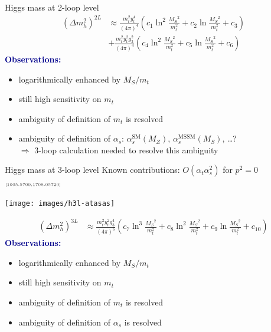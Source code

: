 \documentclass[hyperref={pdfpagelabels=false},ngerman]{beamer}
\newcommand{\cmark}{\ding{51}}%
\newcommand{\ok}{\textcolor{darkgreen}{\cmark}}
\newcommand{\MS}{\ensuremath{M_S}}
\newcommand{\mycite}[1]{\ensuremath{\text{\textcolor{darkgray}{\tiny [#1]}}}}
\renewcommand{\emph}[1]{\textbf{\textcolor{darkblue}{#1}}}
\newcommand{\SM}{\ensuremath{\text{SM}}}
\newcommand{\MSSM}{\ensuremath{\text{MSSM}}}
\newcommand{\at}{\alpha_t}
\newcommand{\as}{\alpha_s}
\begin{document}
\begin{frame}{Higgs mass at 2-loop level}
  \begin{align*}
    (\Delta m_h^2)^{2L} &\approx
    \frac{m_t^2 y_t^4}{(4\pi)^4} \left(
      c_1 \ln^2\frac{\MS^2}{m_t^2}
      + c_2 \ln\frac{\MS^2}{m_t^2}
      + c_3
    \right) \\
    & +
    \frac{m_t^2 y_t^2 g_3^2}{(4\pi)^4} \left(
      c_4 \ln^2\frac{\MS^2}{m_t^2}
      + c_5 \ln\frac{\MS^2}{m_t^2}
      + c_6
    \right)
  \end{align*}
  \emph{Observations:}
  \begin{itemize}
  \item logarithmically enhanced by $\MS / m_t$
  \item still high sensitivity on $m_t$
  \item ambiguity of definition of $m_t$ is resolved \ok
  \item ambiguity of definition of $\as$: $\as^\SM(M_Z)$, $\as^\MSSM(\MS)$, \ldots ? \\
    $\Rightarrow$ 3-loop calculation needed to resolve this ambiguity
  \end{itemize}
\end{frame}

\begin{frame}{Higgs mass at 3-loop level}
  Known contributions: $O(\at\as^2)$ for $p^2 = 0$ \mycite{1005.5709,1708.05720}
  \begin{center}
    \texttt{[image: images/h3l-atasas]}
  \end{center}
  \begin{align*}
    (\Delta m_h^2)^{3L} &\approx
    \frac{m_t^2 y_t^2 g_3^4}{(4\pi)^6} \left(
      c_7 \ln^3\frac{\MS^2}{m_t^2}
      + c_8 \ln^2\frac{\MS^2}{m_t^2}
      + c_9 \ln\frac{\MS^2}{m_t^2}
      + c_{10}
    \right)
  \end{align*}
  \emph{Observations:}
  \begin{itemize}
  \item logarithmically enhanced by $\MS / m_t$
  \item still high sensitivity on $m_t$
  \item ambiguity of definition of $m_t$ is resolved \ok
  \item ambiguity of definition of $\as$ is resolved \ok
  \end{itemize}
\end{frame}
\end{document}
